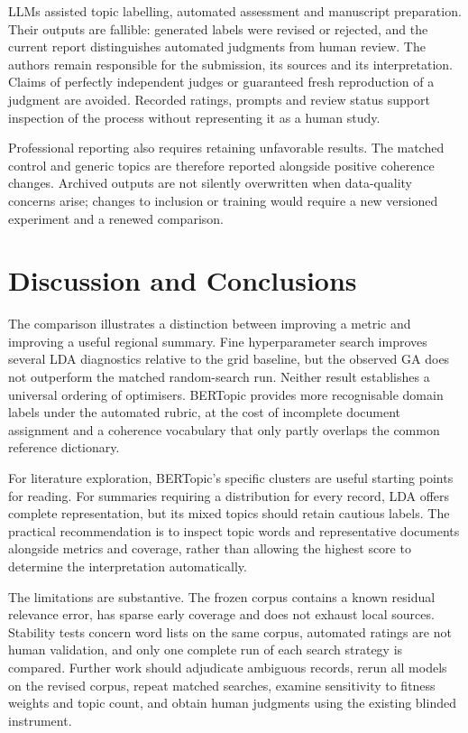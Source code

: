 LLMs assisted topic labelling, automated assessment and manuscript preparation. Their outputs
are fallible: generated labels were revised or rejected, and the current report distinguishes
automated judgments from human review. The authors remain responsible for the submission,
its sources and its interpretation. Claims of perfectly independent judges or guaranteed fresh
reproduction of a judgment are avoided. Recorded ratings, prompts and review status support
inspection of the process without representing it as a human study.

Professional reporting also requires retaining unfavorable results. The matched control and
generic topics are therefore reported alongside positive coherence changes. Archived outputs
are not silently overwritten when data-quality concerns arise; changes to inclusion or training
would require a new versioned experiment and a renewed comparison.

\section{Discussion and Conclusions}
\label{sec:t1-conclusion}
The comparison illustrates a distinction between improving a metric and improving a useful
regional summary. Fine hyperparameter search improves several LDA diagnostics relative to the
grid baseline, but the observed GA does not outperform the matched random-search run. Neither
result establishes a universal ordering of optimisers. BERTopic provides more recognisable
domain labels under the automated rubric, at the cost of incomplete document assignment and
a coherence vocabulary that only partly overlaps the common reference dictionary.

For literature exploration, BERTopic's specific clusters are useful starting points for reading.
For summaries requiring a distribution for every record, LDA offers complete representation,
but its mixed topics should retain cautious labels. The practical recommendation is to inspect
topic words and representative documents alongside metrics and coverage, rather than allowing
the highest score to determine the interpretation automatically.

The limitations are substantive. The frozen corpus contains a known residual relevance error,
has sparse early coverage and does not exhaust local sources. Stability tests concern word lists
on the same corpus, automated ratings are not human validation, and only one complete run of
each search strategy is compared. Further work should adjudicate ambiguous records, rerun all
models on the revised corpus, repeat matched searches, examine sensitivity to fitness weights
and topic count, and obtain human judgments using the existing blinded instrument.

